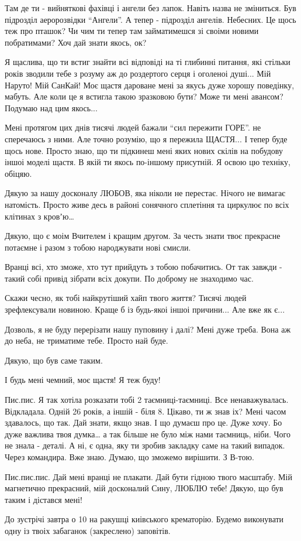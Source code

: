 Там де ти - вийняткові фахівці і ангели без лапок. Навіть назва не зміниться.
Був підрозділ аеророзвідки \enquote{Ангели}. А тепер - підрозділ ангелів. Небесних. Це
щось теж про пташок? Чи чим ти тепер там займатимешся зі своіми новими
побратимами? Хоч дай знати якось, ок?

Я щаслива, що ти встиг знайти всі відповіді на ті глибинні питання, які стільки
років зводили тебе з розуму аж до роздертого серця і оголеноі душі... Мій Наруто!
Мій СанКай! Моє щастя дароване мені за якусь дуже хорошу поведінку, мабуть. Але
коли це я встигла такою зразковою бути? Може ти мені авансом? Подумаю над цим
якось... 

Мені протягом цих днів тисячі людей бажали \enquote{сил пережити ГОРЕ}. не сперечаюсь з
ними. Але точно розумію, що я пережила ЩАСТЯ... І тепер буде щось нове. Просто
знаю, що ти підкинеш мені яких нових скілів на побудову іншоі моделі щастя. В
якій ти якось по-іншому присутній. Я освою цю техніку, обіцяю. 

Дякую за нашу досконалу ЛЮБОВ, яка ніколи не перестає. Нічого не вимагає
натомість. Просто живе десь в районі сонячного сплетіння та циркулює по всіх
клітинах з кровʼю… 

Дякую, що є моім Вчителем і кращим другом. За честь знати твоє прекрасне
потаємне і разом з тобою народжувати нові смисли.

Вранці всі, хто зможе, хто тут прийдуть з тобою побачитись. От так завжди -
такий собі привід зібрати всіх докупи. По доброму не знаходимо час. 

Скажи чесно, як тобі найкрутіший хайп твого життя? Тисячі людей зрефлексували
новиною. Краще б із будь-якоі іншоі причини... Але вже як є... 

Дозволь, я не буду перерізати нашу пуповину і далі? Мені дуже треба. Вона аж до
неба, не триматиме тебе. Просто най буде. 

Дякую, що був саме таким. 

І будь мені чемний, моє щастя! Я теж буду!

Пис.пис. Я так хотіла розказати тобі 2 таємниці-таємниці. Все ненаважувалась.
Відкладала. Одній 26 років, а іншій - біля 8. Цікаво, ти ж знав іх? Мені часом
здавалось, що так. Дай знати, якщо знав. І що думаєш про це. Дуже хочу. Бо дуже
важлива твоя думка… а так більше не було між нами таємниць, ніби. Чого не знала
- деталі. А ні, є одна, яку ти зробив закладку саме на такий випадок. Через
командира. Вже знаю. Думаю, що зможемо вирішити. З В-тою. 

Пис.пис.пис. Дай мені вранці не плакати. Дай бути гідною твого масштабу. Мій
магнетично прекрасний, мій досконалий Сину, ЛЮБЛЮ тебе! Дякую, що був таким і
дістався мені!

До зустрічі завтра о 10 на ракушці киівського крематорію. Будемо виконувати
одну із твоіх забаганок (закреслено) заповітів.
